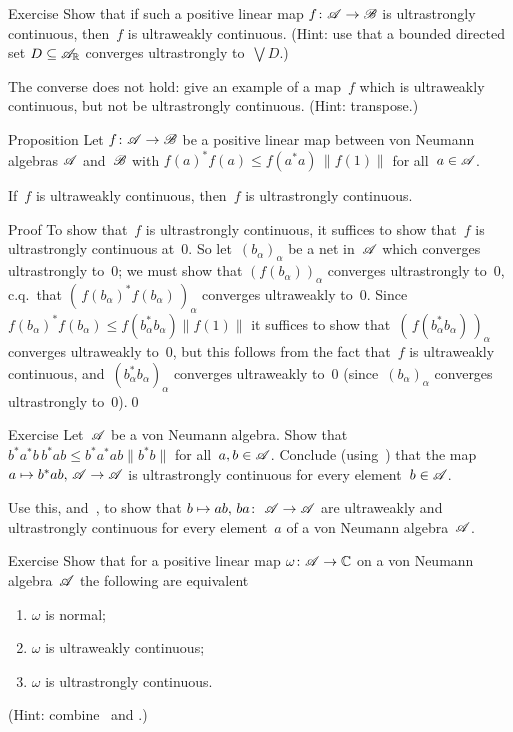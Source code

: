\documentclass[a]{subfiles}
\begin{document}
\begin{parsec}
\begin{point}[p-uwcont]{Exercise}
Show that if such a positive linear map $f\colon \mathscr{A}\to\mathscr{B}$
is ultrastrongly continuous, then~$f$ is ultraweakly continuous.
(Hint: use that a bounded directed set 
$D\subseteq \mathscr{A}_{\mathbb{R}}$ converges ultrastrongly to~$\bigvee D$.)

The converse does not hold: give an example of a map~$f$ 
which is ultraweakly continuous, but 
not be ultrastrongly continuous. (Hint: transpose.)
\end{point}
\begin{point}[cp-uscont]{Proposition}%
Let $f\colon \mathscr{A}\to \mathscr{B}$
be a
positive linear map 
between von Neumann algebras $\mathscr{A}$ and~$\mathscr{B}$
with $f(a)^*f(a)\leq f(a^*a) \,\|f(1)\|$
for all~$a\in\mathscr{A}$.

If~$f$ is ultraweakly continuous,
then~$f$ is ultrastrongly continuous.
\begin{point}{Proof}%
To show that~$f$
is ultrastrongly continuous,
it suffices to show that~$f$ is ultrastrongly continuous at~$0$.
So let~$(b_\alpha)_\alpha$ be a net in~$\mathscr{A}$
which converges ultrastrongly to~$0$;
we must show that $(f(b_\alpha))_\alpha$
converges ultrastrongly to~$0$, c.q.~that
$(\,f(b_\alpha)^*f(b_\alpha)\,)_\alpha$ converges ultraweakly to~$0$.
Since
$f(b_\alpha)^*f(b_\alpha) \leq f(b_\alpha^*b_\alpha) \|f(1)\|$
it suffices to show that~$(\,f(b_\alpha^*b_\alpha)\,)_\alpha$
converges ultraweakly to~$0$,
but this follows from the
fact that~$f$ is ultraweakly continuous,
and~$(b_\alpha^*b_\alpha)_\alpha$
converges ultraweakly to~$0$
(since~$(b_\alpha)_\alpha$ converges ultrastrongly to~$0$).\qed
\end{point}
\end{point}
\begin{point}{Exercise}%
Let~$\mathscr{A}$ be a von Neumann algebra.
Show that~$b^*a^*b\,b^*ab \leq b^*a^*ab \|b^*b\|$
for all~$a,b\in\mathscr{A}$.
Conclude (using~) 
that the map $a\mapsto b^*ab,\,\mathscr{A}\to\mathscr{A}$
is ultrastrongly continuous for every
 element~$b\in\mathscr{A}$.

Use this,
and~,
to
show that $b\mapsto ab,\,ba\colon\ \mathscr{A}\to\mathscr{A}$
are ultraweakly and ultrastrongly continuous
for every element~$a$ of a von Neumann algebra~$\mathscr{A}$.
\end{point}
\begin{point}[npuws]{Exercise}%
Show that for a positive linear map $\omega \colon \mathscr{A}\to\mathbb{C}$
on a von Neumann algebra~$\mathscr{A}$
the following are equivalent
\begin{enumerate}
\item
	$\omega$ is normal;
\item
	$\omega$ is ultraweakly continuous;
\item
	$\omega$ is ultrastrongly continuous.
\end{enumerate}
(Hint: combine~ and .)
\end{point}
\end{parsec}
\end{document}
